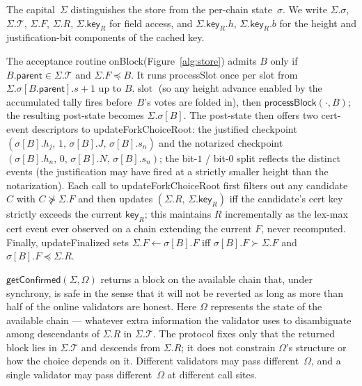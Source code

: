 \documentclass{article}
\newcommand{\T}[0]{\ensuremath{\mathcal{T}}}
\newcommand{\slot}[0]{\ensuremath{\operatorname{\mathrm{slot}}}}
\newcommand{\parent}{\mathsf{parent}}
\newcommand{\key}{\mathsf{key}}
\newcommand{\processSlot}{\textsf{processSlot}\xspace}
\newcommand{\processBlock}{\textsf{processBlock}\xspace}
\newcommand{\onBlock}{\textsf{onBlock}\xspace}
\newcommand{\updateForkChoiceRoot}{\textsf{updateForkChoiceRoot}\xspace}
\newcommand{\updateFinalized}{\textsf{updateFinalized}\xspace}
\newcommand{\getConfirmed}{\textsf{getConfirmed}\xspace}
\theoremstyle{plain}
\theoremstyle{definition}
\theoremstyle{remark}
\begin{document}
The capital~$\Sigma$ distinguishes the store from the per-chain state~$\sigma$.
We write $\Sigma.\sigma$, $\Sigma.\T$, $\Sigma.F$, $\Sigma.R$, $\Sigma.\key_R$ for field access, and $\Sigma.\key_R.h$, $\Sigma.\key_R.b$ for the height and justification-bit components of the cached key.

The acceptance routine \onBlock (Figure~\ref{alg:store}) admits $B$ only if $B.\parent \in \Sigma.\T$ and $\Sigma.F \preceq B$.
It runs \processSlot once per slot from $\Sigma.\sigma[B.\parent].s + 1$ up to $B.\slot$ (so any height advance enabled by the accumulated tally fires before~$B$'s votes are folded in), then $\processBlock(\cdot, B)$; the resulting post-state becomes $\Sigma.\sigma[B]$.
The post-state then offers two cert-event descriptors to \updateForkChoiceRoot: the justified checkpoint $(\sigma[B].h_j,\, 1,\, \sigma[B].J,\, \sigma[B].s_n)$ and the notarized checkpoint $(\sigma[B].h_n,\, 0,\, \sigma[B].N,\, \sigma[B].s_n)$; the bit-$1$ / bit-$0$ split reflects the distinct events (the justification may have fired at a strictly smaller height than the notarization).
Each call to \updateForkChoiceRoot first filters out any candidate~$C$ with $C \not\succeq \Sigma.F$ and then updates $(\Sigma.R,\, \Sigma.\key_R)$ iff the candidate's cert key strictly exceeds the current $\key_R$; this maintains $R$ incrementally as the lex-max cert event ever observed on a chain extending the current $F$, never recomputed.
Finally, \updateFinalized sets $\Sigma.F \gets \sigma[B].F$ iff $\sigma[B].F \succ \Sigma.F$ and $\sigma[B].F \preceq \Sigma.R$.

$\getConfirmed(\Sigma, \Omega)$ returns a block on the available chain that, under synchrony, is safe in the sense that it will not be reverted as long as more than half of the online validators are honest. Here $\Omega$ represents the state of the available chain --- whatever extra information the validator uses to disambiguate among descendants of $\Sigma.R$ in $\Sigma.\T$. The protocol fixes only that the returned block lies in $\Sigma.\T$ and descends from $\Sigma.R$; it does not constrain $\Omega$'s structure or how the choice depends on it. Different validators may pass different~$\Omega$, and a single validator may pass different~$\Omega$ at different call sites.
\end{document}
